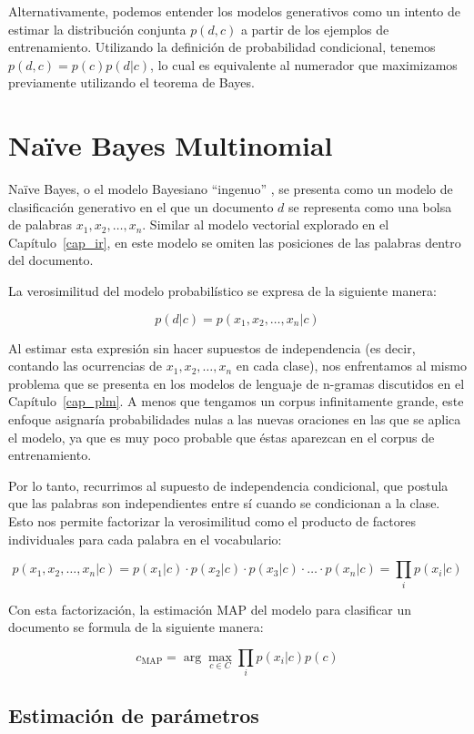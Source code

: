 Alternativamente, podemos entender los modelos generativos como un intento de estimar la distribución conjunta $p(d, c)$ a partir de los ejemplos de entrenamiento. Utilizando la definición de probabilidad condicional, tenemos $p(d, c) = p(c)p(d|c)$, lo cual es equivalente al numerador que maximizamos previamente utilizando el teorema de Bayes.

\section{Naïve Bayes Multinomial}

Naïve Bayes, o el modelo Bayesiano ``ingenuo'' \cite{mccallum1998comparison}, se presenta como un modelo de clasificación generativo en el que un documento $d$ se representa como una bolsa de palabras $x_1, x_2, \ldots, x_n$. Similar al modelo vectorial explorado en el Capítulo~\ref{cap_ir}, en este modelo se omiten las posiciones de las palabras dentro del documento.

La verosimilitud del modelo probabilístico se expresa de la siguiente manera:

\[
p(d|c) = p(x_1, x_2, \ldots, x_n | c)
\]

Al estimar esta expresión sin hacer supuestos de independencia (es decir, contando las ocurrencias de $x_1, x_2, \ldots, x_n$ en cada clase), nos enfrentamos al mismo problema que se presenta en los modelos de lenguaje de n-gramas discutidos en el Capítulo~\ref{cap_plm}. A menos que tengamos un corpus infinitamente grande, este enfoque asignaría probabilidades nulas a las nuevas oraciones en las que se aplica el modelo, ya que es muy poco probable que éstas aparezcan en el corpus de entrenamiento.

Por lo tanto, recurrimos al supuesto de independencia condicional, que postula que las palabras son independientes entre sí cuando se condicionan a la clase. Esto nos permite factorizar la verosimilitud como el producto de factores individuales para cada palabra en el vocabulario:

\[
p(x_1, x_2, \ldots, x_n | c) = p(x_1 | c) \cdot p(x_2 | c) \cdot p(x_3 | c) \cdot \ldots \cdot p(x_n | c) = \prod_{i} p(x_i | c)
\]

Con esta factorización, la estimación MAP del modelo para clasificar un documento se formula de la siguiente manera:

\[
c_{\text{MAP}} = \arg\max_{c \in C} \prod_{i} p(x_i | c)p(c)
\]

\subsection{Estimación de parámetros}

